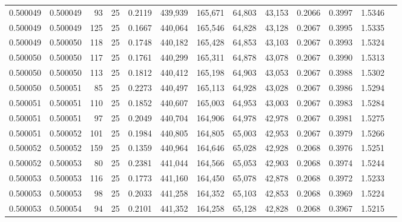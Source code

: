 \begin{tabular}{rrrrrrrrrrrrr}
0.500049 & 0.500049 &  93 &  25 &                                     0.2119 & 439,939 & 165,671 &  64,803 &  43,153 & 0.2066 & 0.3997 & 1.5346 \\
0.500049 & 0.500049 & 125 &  25 &                                     0.1667 & 440,064 & 165,546 &  64,828 &  43,128 & 0.2067 & 0.3995 & 1.5335 \\
0.500049 & 0.500050 & 118 &  25 &                                     0.1748 & 440,182 & 165,428 &  64,853 &  43,103 & 0.2067 & 0.3993 & 1.5324 \\
0.500050 & 0.500050 & 117 &  25 &                                     0.1761 & 440,299 & 165,311 &  64,878 &  43,078 & 0.2067 & 0.3990 & 1.5313 \\
0.500050 & 0.500050 & 113 &  25 &                                     0.1812 & 440,412 & 165,198 &  64,903 &  43,053 & 0.2067 & 0.3988 & 1.5302 \\
0.500050 & 0.500051 &  85 &  25 &                                     0.2273 & 440,497 & 165,113 &  64,928 &  43,028 & 0.2067 & 0.3986 & 1.5294 \\
0.500051 & 0.500051 & 110 &  25 &                                     0.1852 & 440,607 & 165,003 &  64,953 &  43,003 & 0.2067 & 0.3983 & 1.5284 \\
0.500051 & 0.500051 &  97 &  25 &                                     0.2049 & 440,704 & 164,906 &  64,978 &  42,978 & 0.2067 & 0.3981 & 1.5275 \\
0.500051 & 0.500052 & 101 &  25 &                                     0.1984 & 440,805 & 164,805 &  65,003 &  42,953 & 0.2067 & 0.3979 & 1.5266 \\
0.500052 & 0.500052 & 159 &  25 &                                     0.1359 & 440,964 & 164,646 &  65,028 &  42,928 & 0.2068 & 0.3976 & 1.5251 \\
0.500052 & 0.500053 &  80 &  25 &                                     0.2381 & 441,044 & 164,566 &  65,053 &  42,903 & 0.2068 & 0.3974 & 1.5244 \\
0.500053 & 0.500053 & 116 &  25 &                                     0.1773 & 441,160 & 164,450 &  65,078 &  42,878 & 0.2068 & 0.3972 & 1.5233 \\
0.500053 & 0.500053 &  98 &  25 &                                     0.2033 & 441,258 & 164,352 &  65,103 &  42,853 & 0.2068 & 0.3969 & 1.5224 \\
0.500053 & 0.500054 &  94 &  25 &                                     0.2101 & 441,352 & 164,258 &  65,128 &  42,828 & 0.2068 & 0.3967 & 1.5215 \\

\end{tabular}
